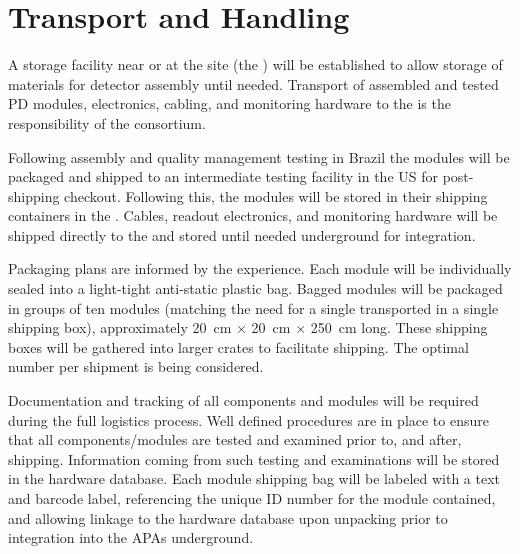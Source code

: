 \section{Transport and Handling}
\label{sec:fdsp-pd-install}



A storage facility near or at the  site (the ) will be established to allow storage of materials for detector assembly until needed.  Transport of assembled and tested PD modules, electronics, cabling, and monitoring hardware to the  is the responsibility of the  consortium.



Following assembly and quality management testing in Brazil the  modules  will be packaged and shipped to an intermediate testing facility in the US for post-shipping checkout. Following this, the modules will be stored in their shipping containers in the .  Cables, readout electronics, and monitoring hardware will be shipped directly to the  and stored until needed underground for integration.

Packaging plans are informed by the  experience.  Each  module will be individually sealed into a light-tight anti-static plastic bag.  Bagged modules will be packaged in groups of ten modules (matching the need for a single  transported in a single shipping box), approximately \SI{20}{cm} $\times$ \SI{20}{cm} $\times$ \SI{250}{cm} long.  These shipping boxes will be gathered into larger crates to facilitate shipping.  The optimal number per shipment is being considered.

Documentation and tracking of all components and  modules will be required during the full logistics process. Well defined procedures are in place to ensure that all components/modules are tested and examined prior to, and after, shipping. Information coming from such testing and examinations will be stored in the  hardware database.  Each  module shipping bag will be labeled with a text and barcode label, referencing the unique ID number for the module contained, and allowing linkage to the hardware database upon unpacking prior to integration into the APAs underground.

